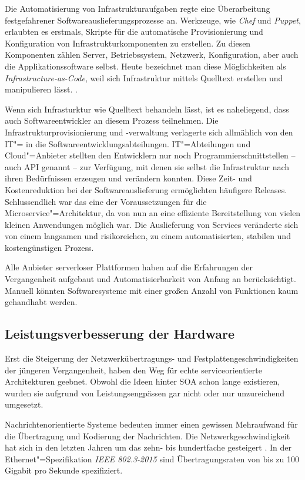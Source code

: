 Die Automatisierung von Infrastrukturaufgaben regte eine Überarbeitung festgefahrener Softwareauslieferungsprozesse an. Werkzeuge, wie \textit{Chef} und \textit{Puppet}, erlaubten es erstmals, Skripte für die automatische Provisionierung und Konfiguration von Infrastrukturkomponenten zu erstellen. Zu diesen Komponenten zählen Server, Betriebssystem, Netzwerk, Konfiguration, aber auch die Applikationssoftware selbst. Heute bezeichnet man diese Möglichkeiten als \textit{Infrastructure-as-Code}, weil sich Infrastruktur mittels Quelltext erstellen und manipulieren lässt. \cite[135]{Httermann:2012:DD:2380958}.

Wenn sich Infrasturktur wie Quelltext behandeln lässt, ist es naheliegend, dass auch Softwareentwickler an diesem Prozess teilnehmen. Die Infrastrukturprovisionierung und -verwaltung verlagerte sich allmählich von den IT"= in die Softwareentwicklungsabteilungen. IT"=Abteilungen und Cloud"=Anbieter stellten den Entwicklern nur noch Programmierschnittstellen -- auch API genannt -- zur Verfügung, mit denen sie selbst die Infrastruktur nach ihren Bedürfnissen erzeugen und verändern konnten. Diese Zeit- und Kostenreduktion bei der Softwareauslieferung ermöglichten häufigere Releases. Schlussendlich war das eine der Voraussetzungen für die Microservice"=Architektur, da von nun an eine effiziente Bereitstellung von vielen kleinen Anwendungen möglich war. Die Auslieferung von Services veränderte sich von einem langsamen und risikoreichen, zu einem automatisierten, stabilen und kostengünstigen Prozess.

Alle Anbieter serverloser Plattformen haben auf die Erfahrungen der Vergangenheit aufgebaut und Automatisierbarkeit von Anfang an berücksichtigt. Manuell könnten Softwaresysteme mit einer großen Anzahl von Funktionen kaum gehandhabt werden. 

\subsection{Leistungsverbesserung der Hardware}

Erst die Steigerung der Netzwerkübertragungs- und Festplattengeschwindigkeiten der jüngeren Vergangenheit, haben den Weg für echte serviceorientierte Architekturen geebnet. Obwohl die Ideen hinter SOA schon lange existieren, wurden sie aufgrund von Leistungsengpässen gar nicht oder nur unzureichend umgesetzt.

Nachrichtenorientierte Systeme bedeuten immer einen gewissen Mehraufwand für die Übertragung und Kodierung der Nachrichten. Die Netzwerkgeschwindigkeit hat sich in den letzten Jahren um das zehn- bis hundertfache gesteigert \cite{IEEEBandwidth}. In der Ethernet"=Spezifikation \textit{IEEE 802.3-2015} sind Übertragungsraten von bis zu 100 Gigabit pro Sekunde spezifiziert.

